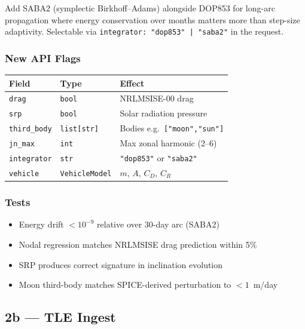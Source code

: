 \documentclass[11pt, a4paper]{article}
\begin{document}
Add SABA2 (symplectic Birkhoff--Adams) alongside DOP853 for long-arc
propagation where energy conservation over months matters more than step-size
adaptivity. Selectable via \texttt{integrator: "dop853" | "saba2"} in the
request.

\subsubsection{New API Flags}

\begin{center}
\begin{tabular}{L{3cm} L{4cm} L{5cm}}
  \toprule
  \textbf{Field} & \textbf{Type} & \textbf{Effect} \\
  \midrule
  \texttt{drag}       & \texttt{bool}        & NRLMSISE-00 drag \\
  \texttt{srp}        & \texttt{bool}        & Solar radiation pressure \\
  \texttt{third\_body}& \texttt{list[str]}   & Bodies e.g.\ \texttt{["moon","sun"]} \\
  \texttt{jn\_max}    & \texttt{int}         & Max zonal harmonic (2–6) \\
  \texttt{integrator} & \texttt{str}         & \texttt{"dop853"} or \texttt{"saba2"} \\
  \texttt{vehicle}    & \texttt{VehicleModel}& $m$, $A$, $C_D$, $C_R$ \\
  \bottomrule
\end{tabular}
\end{center}

\subsubsection{Tests}

\begin{itemize}[noitemsep]
  \item Energy drift $< 10^{-9}$ relative over 30-day arc (SABA2)
  \item Nodal regression matches NRLMSISE drag prediction within 5\%
  \item SRP produces correct signature in inclination evolution
  \item Moon third-body matches SPICE-derived perturbation to $< 1$~m/day
\end{itemize}

\subsection{2b — TLE Ingest}
\end{document}
